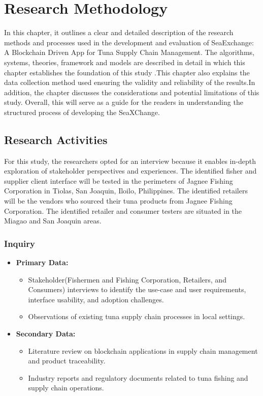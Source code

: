 \chapter{Research Methodology}
In this chapter, it outlines a clear and detailed description of the research methods and processes used in the development and evaluation of SeaExchange: A Blockchain Driven App for Tuna Supply Chain Management. The algorithms, systems, theories, framework and models are described in detail in which this chapter establishes the foundation of this study .This chapter also explains the data collection method used ensuring the validity and reliability of the results.In addition, the chapter discusses the considerations and potential limitations of this study. Overall, this will serve as a guide for the readers in understanding the structured process of developing the SeaXChange.

\section{Research Activities}
For this study, the researchers opted for an interview because it enables in-depth exploration of stakeholder perspectives and experiences. 
The identified fisher and supplier client interface will be tested in the perimeters of Jagnee Fishing Corporation in Tiolas, San Joaquin, Iloilo, Philippines. The identified retailers will be the vendors who sourced their tuna products from Jagnee Fishing Corporation. The identified retailer and consumer testers are situated in the Miagao and San Joaquin areas. 

\subsection{Inquiry}

\begin{itemize}
	\item \textbf{Primary Data:} 
	\begin{itemize}
		\item Stakeholder(Fishermen and Fishing Corporation, Retailers, and Consumers) interviews to identify the use-case and user requirements, interface usability, and adoption challenges.
		\item Observations of existing tuna supply chain processes in local settings.
	\end{itemize}
	\item \textbf{Secondary Data:} 
	\begin{itemize}
		\item Literature review on blockchain applications in supply chain management and product traceability.
		\item Industry reports and regulatory documents related to tuna fishing and supply chain operations.
	\end{itemize}
\end{itemize}

